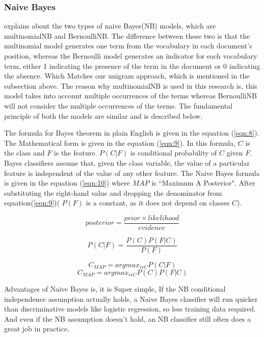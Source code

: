 \subsubsection{Naive Bayes}

\cite{Manning:2008} explains about the two types of naive Bayes(NB) models, which are multinomialNB and BernoulliNB. The difference between these two is that the multinomial model generates one term from the vocabulary in each document's position, whereas the Bernoulli model generates an indicator for each vocabulary term, either 1 indicating the presence of the term in the document or 0 indicating the absence. Which Matches  our unigram approach, which is mentioned in the subsection above. The reason why multinomialNB is used in this research is, this model takes into account multiple occurrences of the terms whereas BernoulliNB will not consider the multiple occurrences of the terms. The fundamental principle of both the models are similar and is described below.

The formula for Bayes theorem in plain English is given in the equation (\ref{eqn:8}). The Mathematical form is given in the equation (\ref{eqn:9}). In this formula, $C$ is the class and $F$ is the feature. $P(C|F)$ is conditional probability of $C$ given $F$. Bayes classifiers assume that, given the class variable, the value of a particular feature is independent of the value of any other feature. The Naive Bayes formula is given in the equation (\ref{eqn:10}) where $MAP$ is ``Maximum A
Posterior". After substituting the right-hand value and dropping the denominator from equation(\ref{eqn:9})( $P(F)$ is a constant, as it does not depend on classes $C$). 



\begin{equation}
\label{eqn:8}
posterior = \frac{prior \times likelihood}{evidence}
\end{equation}

\begin{equation}
\label{eqn:9}
P(C|F) = \frac{P(C) P(F|C) }{P(F)}
\end{equation}

\begin{equation}
\label{eqn:10}
C_{MAP} = argmax_{c\epsilon C} P(C|F) 
\end{equation}
\begin{equation}
\label{eqn:11}
C_{MAP} = argmax_{c\epsilon C} P(C) P(F|C)  
\end{equation}


Advantages of Naive Bayes is, it is Super simple, If the NB conditional independence assumption actually holds, a Naive Bayes classifier will run quicker than discriminative models like logistic regression, so less training data required. And even if the NB assumption doesn’t hold, an NB classifier still often does a great job in practice.

